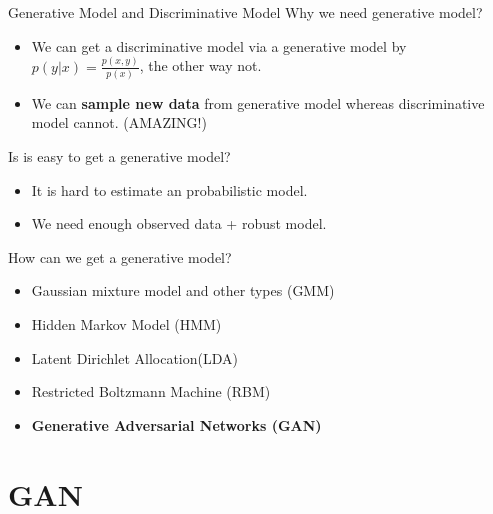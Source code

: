 \documentclass[10pt]{beamer}
\newcommand{\subtitlepage}[3]{\title{#1}\subtitle{#2}\author{#3}\date{}\begin{frame}[plain]\titlepage\end{frame}}
\begin{document}
	\begin{frame}{Generative Model and Discriminative Model}
		Why we need generative model?
		\begin{itemize}
			\pause
			\item We can get a discriminative model via a generative model by $p(y|x)=\frac{p(x, y)}{p(x)}$, the other way not. 
			\pause
			\item We can \textbf{sample new data} from generative model whereas discriminative model cannot. (AMAZING!)
		\end{itemize}
		\pause
		Is is easy to get a generative model?
		\begin{itemize}
			\pause
			\item It is hard to estimate an probabilistic model.
			\pause
			\item We need enough observed data + robust model.
		\end{itemize}
		\pause
		How can we get a generative model?
		\begin{itemize}
			\pause
			\item Gaussian mixture model and other types (GMM)
			\pause
			\item Hidden Markov Model (HMM)
			\pause
			\item Latent Dirichlet Allocation(LDA)
			\pause
			\item Restricted Boltzmann Machine (RBM)
			\pause
			\item \textbf{Generative Adversarial Networks (GAN)}
		\end{itemize}
	\end{frame}

	\part{GAN}
	\subtitlepage{}{Generative Adversarial Nets}{Ian J. Goodfellow, Jean Pouget-Abadie, Mehdi Mirza, Bing Xu, \\ David Warde-Farley, Sherjil Ozair, Aaron Courville, Yoshua Bengio. \\ NIPS 2014\\ arXiv: 1406.2661}
	
\end{document}
